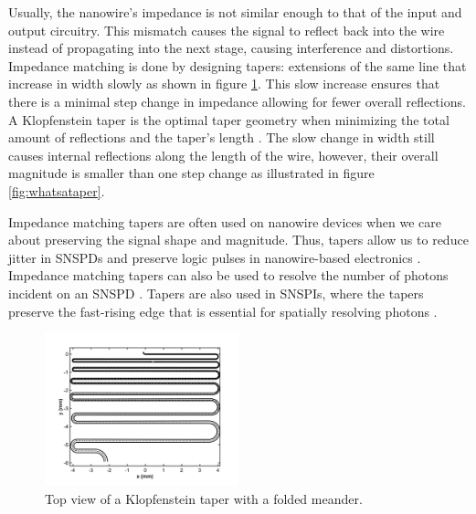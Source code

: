 Usually, the nanowire's impedance is not similar enough to that of the input and output circuitry. This mismatch causes the signal to reflect back into the wire instead 
of propagating into the next stage, causing interference and distortions. Impedance 
matching is done by designing tapers: extensions of the same line that increase in 
width slowly as shown in figure \ref{fig:thewiredesign}. This slow increase ensures 
that there is a minimal step change in impedance allowing for fewer overall reflections. A Klopfenstein taper is the optimal taper geometry when minimizing the total amount 
of reflections and the taper's length \cite{klopfenstein_transmission_1956}. 
The slow change in width still causes internal reflections along the length of the 
wire, however, their overall magnitude is smaller than one step change as illustrated in 
figure \ref{fig:whatsataper}.

Impedance matching tapers are often used on nanowire devices when we care about preserving
the signal shape and magnitude. Thus, tapers allow us to reduce jitter in SNSPDs and preserve logic pulses in
nanowire-based electronics \cite{snspd-tapers-paper, maximizing_ic_w_taper}. 
Impedance matching tapers can also be used to resolve the 
number of photons incident on an SNSPD \cite{pnr}.
Tapers are also used in SNSPIs, where the tapers
preserve the fast-rising edge that is essential for spatially
resolving photons \cite{snspi_paper}. 

\begin{figure}[h]
    \centering
\includegraphics[width=0.5\textwidth]{figs/wire_matlab.png}
    \caption{Top view of a Klopfenstein taper with a folded meander.}
    \label{fig:thewiredesign}
\end{figure}

